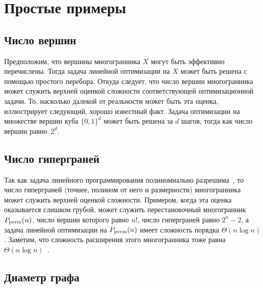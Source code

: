 \section{Простые примеры}
\label{sec:SimpleCounterexamples}

\subsection{Число вершин}

Предположим, что вершины многогранника $X$ могут быть эффективно перечислены. Тогда задача линейной оптимизации на $X$ может быть решена с помощью простого перебора. Откуда следует, что число вершин многогранника может служить верхней оценкой сложности соответствующей оптимизационной задачи. То, насколько далекой от реальности может быть эта оценка, иллюстрирует следующий, хорошо известный факт. Задача оптимизации на множестве вершин куба $\{0,1\}^d$ может быть решена за $d$ шагов, тогда как число вершин равно~$2^d$.

\subsection{Число гиперграней}

Так как задача линейного программирования полиномиально разрешима~\cite{Khachiyan:1979,Karmarkar:1984}, то число гиперграней (точнее, полином от него и размерности) многогранника может служить верхней оценкой сложности.
Примером, когда эта оценка оказывается слишком грубой, может служить перестановочный многогранник $P_{\textup{perm}}(n)$, число вершин которого равно $n!$, число гиперграней равно $2^n-2$, а задача линейной оптимизации на $P_{\textup{perm}}(n)$ имеет сложность порядка $\Theta(n \log n)$.
Заметим, что сложность расширения этого многогранника тоже равна $\Theta(n \log n)$~\cite{Goemans:2015}.

\subsection{Диаметр графа}

